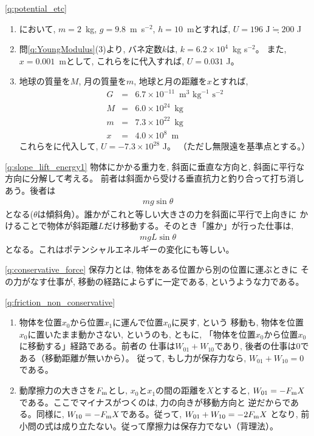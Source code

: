 \ref{q:potential_etc}
\begin{enumerate}
\item {}において, $m=2$~kg, $g=9.8$~m~s$^{-2}$, $h=10$~mとすれば, 
$U=196\,\,\text{J}\fallingdotseq 200$ J
\item 問\ref{q:YoungModulus}(3)より, バネ定数$k$は, $k=6.2\times 10^4$~kg s$^{-2}$。
また, $x=0.001$~mとして, これらをに代入すれば, $U=0.031$ J。
\item 地球の質量を$M$, 月の質量を$m$, 地球と月の距離を$x$とすれば, 
\begin{eqnarray*}
G&=&6.7\times 10^{-11}\,\text{ m}^3\,\,\text{kg}^{-1}\,\,\text{s}^{-2}\\
M&=&6.0\times 10^{24}\,\text{ kg}\\
m&=&7.3\times 10^{22}\,\text{ kg}\\
x&=&4.0\times 10^{8}\,\text{ m}
\end{eqnarray*}
これらをに代入して, $U=-7.3\times 10^{28}$ J。
（ただし無限遠を基準点とする。）
\end{enumerate}
\mv

\ref{q:slope_lift_energy1}
物体にかかる重力を, 斜面に垂直な方向と, 斜面に平行な方向に分解して考える。
前者は斜面から受ける垂直抗力と釣り合って打ち消しあう。後者は
\begin{eqnarray}mg\sin\theta\end{eqnarray}
となる($\theta$は傾斜角）。誰かがこれと等しい大きさの力を斜面に平行で上向きに
かけることで物体が斜距離$L$だけ移動する。そのとき「誰か」が行った仕事は, 
\begin{eqnarray}mgL\sin\theta\end{eqnarray}
となる。これはポテンシャルエネルギーの変化にも等しい。\mv


\ref{q:conservative_force}
保存力とは, 物体をある位置から別の位置に運ぶときに
その力がなす仕事が, 移動の経路によらずに一定である, というような力である。\mv


\ref{q:friction_non_conservative}
\begin{enumerate}
\item 物体を位置$x_0$から位置$x_1$に運んで位置$x_0$に戻す, という
移動も, 物体を位置$x_0$に置いたまま動かさない, というのも, ともに, 
「物体を位置$x_0$から位置$x_0$に移動する」経路である。前者の
仕事は$W_{01}+W_{10}$であり, 後者の仕事は0である（移動距離が無いから）。
従って, もし力が保存力なら, $W_{01}+W_{10}=0$である。
\item 動摩擦力の大きさを$F_{\text m}$とし, $x_0$と$x_1$の間の距離を$X$とすると, 
$W_{01}=-F_{\text m}X$である。ここでマイナスがつくのは, 力の向きが移動方向と
逆だからである。同様に, $W_{10}=-F_{\text m}X$である。従って, 
$W_{01}+W_{10}=-2F_{\text m}X$
となり, 前小問の式は成り立たない。従って摩擦力は保存力でない（背理法）。
\end{enumerate}
\mv

